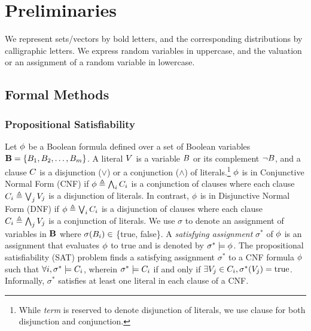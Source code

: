 \chapter{Preliminaries}
\label{chapter:preliminaries}
We represent sets/vectors by bold letters, and the corresponding distributions by calligraphic letters. We express random variables in uppercase, and the valuation or an assignment of a random variable in lowercase.




\section{Formal Methods}

\subsection{Propositional Satisfiability}

Let $\phi$ be a Boolean formula defined over a set of Boolean variables $\mathbf{B} = \{B_1,B_2,\dots ,B_m \}$. A literal $ V $ is a variable $ B $ or its complement $\neg B$, and a clause $ C $ is a disjunction ($ \vee $) or a conjunction ($ \wedge $) of literals.\footnote{While \emph{term} is reserved to denote disjunction of literals, we use clause for both disjunction and conjunction.}  $\phi$ is in Conjunctive Normal Form (CNF) if $\phi \triangleq  \bigwedge_i C_i$ is a conjunction of clauses where each clause $C_i \triangleq  \bigvee_j V_j $  is a disjunction of literals. In contrast, $ \phi $ is in Disjunctive Normal Form (DNF) if $\phi \triangleq  \bigvee_i C_i$ is a disjunction of clauses where each clause $C_i \triangleq  \bigwedge_j V_j $ is a conjunction of literals. We use $\sigma$ to denote an assignment of variables in  $\mathbf{B}$ where $ \sigma(B_i) \in $ \{true, false\}. A \emph{satisfying assignment} $ \sigma^* $ of $\phi$ is an assignment  that evaluates $\phi$  to true and is denoted by $ \sigma^* \models \phi $. The propositional satisfiability (SAT) problem finds a satisfying assignment $ \sigma^* $ to a CNF formula $ \phi $  such that $ \forall i, \sigma^* \models C_i $, wherein $ \sigma^*\models C_i $ if and only if $ \exists V_j \in C_i, \sigma^*(V_j) = \text{true} $. Informally, $ \sigma^* $ satisfies at least one literal in each clause of a CNF. 


